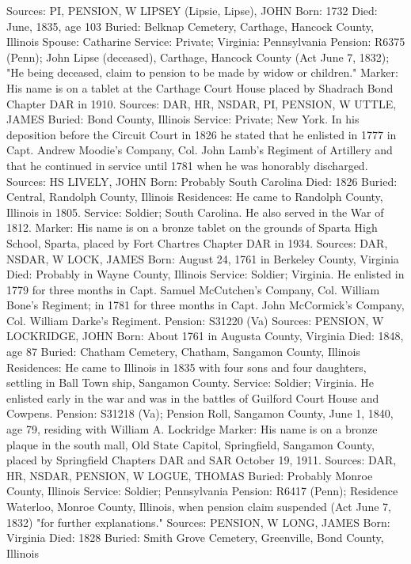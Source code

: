 Sources: PI, PENSION, W 
LIPSEY (Lipsie, Lipse), JOHN
Born: 1732
Died: June, 1835, age 103
Buried: Belknap Cemetery, Carthage, Hancock County, Illinois
Spouse: Catharine
Service: Private; Virginia: Pennsylvania
Pension: R6375 (Penn); John Lipse (deceased), Carthage, Hancock County (Act June 7, 1832); "He being deceased, claim to pension to be made by widow or children."
Marker: His name is on a tablet at the Carthage Court House placed by Shad­rach Bond Chapter DAR in 1910.
Sources: DAR, HR, NSDAR, PI, PENSION, W 
 UTTLE, JAMES
Buried: Bond County, Illinois 
Service: Private; New York. In his deposition before the Circuit Court in 1826 he stated that he enlisted in 1777 in Capt. Andrew Moodie's Company, Col. John Lamb's Regiment of Artillery and that he continued in service until 1781 when he was honorably discharged. 
Sources: HS 
LIVELY, JOHN
Born: Probably South Carolina
Died: 1826
Buried: Central, Randolph County, Illinois Residences: He came to Randolph County, Illinois in 1805.
Service: Soldier; South Carolina. He also served in the War of 1812.
Marker: His name is on a bronze tablet on the grounds of Sparta High School, Sparta, placed by Fort Chartres Chapter DAR in 1934.
Sources: DAR, NSDAR, W 
LOCK, JAMES
Born: August 24, 1761 in Berkeley County, Virginia
Died: Probably in Wayne County, Illinois
Service: Soldier; Virginia. He enlisted in 1779 for three months in Capt. Samuel McCutchen's Company, Col. William Bone's Regiment; in 1781 for three months in Capt. John McCormick's Company, Col. William Darke's Regiment.
Pension: S31220 (Va)
Sources: PENSION, W 
LOCKRIDGE, JOHN
Born: About 1761 in Augusta County, Virginia
Died: 1848, age 87
Buried: Chatham Cemetery, Chatham, Sangamon County, Illinois Residences: He came to Illinois in 1835 with four sons and four daughters, settling in Ball Town ship, Sangamon County.
Service: Soldier; Virginia. He enlisted early in the war and was in the battles of Guilford Court House and Cowpens.
Pension: S31218 (Va); Pension Roll, Sangamon County, June 1, 1840, age 79, residing with William A. Lockridge
Marker: His name is on a bronze plaque in the south mall, Old State Capitol, Springfield, Sangamon County, placed by Springfield Chapters DAR and SAR October 19, 1911.
Sources: DAR, HR, NSDAR, PENSION, W 
LOGUE, THOMAS
Buried: Probably Monroe County, Illinois
Service: Soldier; Pennsylvania
Pension: R6417 (Penn); Residence Waterloo, Monroe County, Illinois, when pen­sion claim suspended (Act June 7, 1832) "for further explanations."
Sources: PENSION, W 
LONG, JAMES 
Born: Virginia 
Died: 1828 
Buried: Smith Grove Cemetery, Greenville, Bond County, Illinois 
